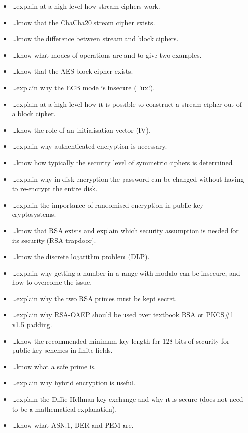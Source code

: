 \documentclass[usegeometry,parskip=half]{scrartcl}
\begin{document}
\begin{itemize}
  \item \dots{}explain at a high level how stream ciphers work.
  \item \dots{}know that the ChaCha20 stream cipher exists.
  \item \dots{}know the difference between stream and block ciphers.
  \item \dots{}know what modes of operations are and to give two examples.
  \item \dots{}know that the AES block cipher exists.
  \item \dots{}explain why the ECB mode is insecure (Tux!).
  \item \dots{}explain at a high level how it is possible to construct a stream cipher out of a block cipher.
  \item \dots{}know the role of an initialisation vector (IV).
  \item \dots{}explain why authenticated encryption is necessary.
  \item \dots{}know how typically the security level of symmetric ciphers is determined.
  \item \dots{}explain why in disk encryption the password can be changed without having to re-encrypt the entire disk.
  \item \dots{}explain the importance of randomised encryption in public key cryptosystems.
  \item \dots{}know that RSA exists and explain which security assumption is needed for its security (RSA trapdoor).
  \item \dots{}know the discrete logarithm problem (DLP).
  \item \dots{}explain why getting a number in a range with modulo can be insecure, and how to overcome the issue.
  \item \dots{}explain why the two RSA primes must be kept secret.
  \item \dots{}explain why RSA-OAEP should be used over textbook RSA or PKCS\#1 v1.5 padding.
  \item \dots{}know the recommended minimum key-length for 128 bits of security for public key schemes in finite fields.
  \item \dots{}know what a safe prime is.
  \item \dots{}explain why hybrid encryption is useful.
  \item \dots{}explain the Diffie Hellman key-exchange and why it is secure (does not need to be a mathematical explanation).
  \item \dots{}know what ASN.1, DER and PEM are.

\end{itemize}
\end{document}

